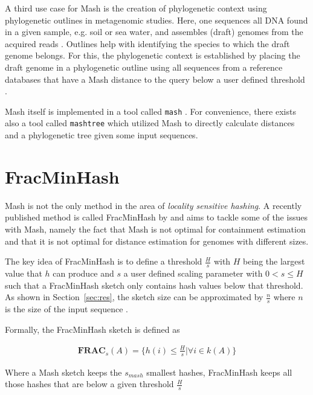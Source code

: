 A third use case for Mash is the creation of phylogenetic context using
phylogenetic outlines \cite{bagciMicrobialPhylogeneticContext2021} in
metagenomic studies. Here, one sequences all DNA found in a given sample, e.g.
soil or sea water, and assembles (draft) genomes from the acquired reads
\cite{kuninBioinformaticianGuideMetagenomics2008}. Outlines help with
identifying the species to which the draft genome belongs. For this, the
phylogenetic context is established by placing the draft genome in a
phylogenetic outline using all sequences from a reference databases that have a
Mash distance to the query below a user defined threshold
\cite{bagciMicrobialPhylogeneticContext2021}.

Mash itself is implemented in a tool called \texttt{mash}
\cite{ondovMashFastGenome2016}. For convenience, there exists also a tool called
\texttt{mashtree} \cite{katzMashtreeRapidComparison2019} which utilized Mash to
directly calculate distances and a phylogenetic tree given some input sequences.

\section{FracMinHash}
Mash is not the only method in the area of \textit{locality sensitive hashing}.
A recently published method is called FracMinHash by
\cite{irberLightweightCompositionalAnalysis2022} and aims to tackle some of the
issues with Mash, namely the fact that Mash is not optimal for containment
estimation and that it is not optimal for distance estimation for genomes with
different sizes.

The key idea of FracMinHash is to define a threshold $\frac{H}{s}$ with $H$
being the largest value that $h$ can produce and $s$ a user defined scaling
parameter with $0 < s \leq H$ such that a FracMinHash sketch only contains hash
values below that threshold. As shown in Section~\ref{sec:res}, the sketch size can be
approximated by $\frac{n}{s}$ where $n$ is the size of the input sequence
\cite{irberLightweightCompositionalAnalysis2022,heraDebiasingFracMinHashDeriving2023}.


Formally, the FracMinHash sketch is defined as 

\begin{align}
  \mathbf{FRAC}_s(A) = \{h(i) \leq \frac{H}{s} | \forall i \in k(A)\}
\end{align}

Where a Mash sketch keeps the $s_{mash}$ smallest hashes, FracMinHash keeps all
those hashes that are below a given threshold $\frac{H}{s}$

